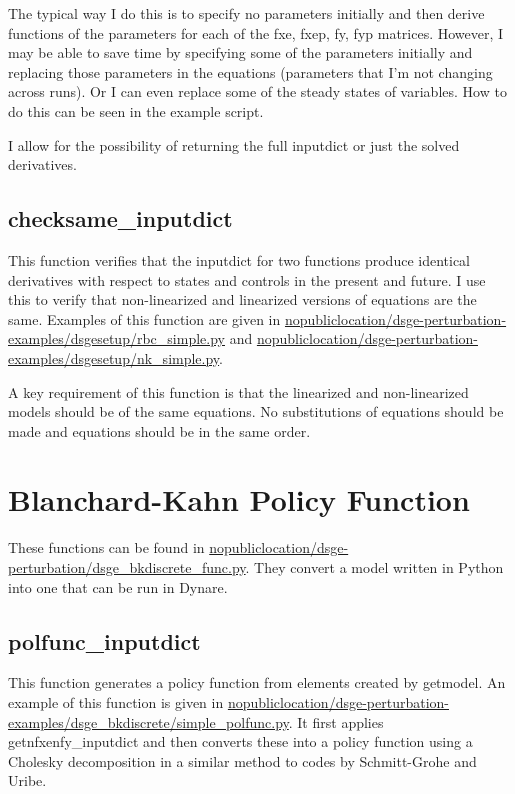 \documentclass{article}
\theoremstyle{definition}
\begin{document}
The typical way I do this is to specify no parameters initially and then derive functions of the parameters for each of the fxe, fxep, fy, fyp matrices. However, I may be able to save time by specifying some of the parameters initially and replacing those parameters in the equations (parameters that I'm not changing across runs). Or I can even replace some of the steady states of variables. How to do this can be seen in the example script.

I allow for the possibility of returning the full inputdict or just the solved derivatives.

\subsection{checksame\_inputdict}
This function verifies that the inputdict for two functions produce identical derivatives with respect to states and controls in the present and future. I use this to verify that non-linearized and linearized versions of equations are the same. Examples of this function are given in \url{nopubliclocation/dsge-perturbation-examples/dsgesetup/rbc_simple.py} and \url{nopubliclocation/dsge-perturbation-examples/dsgesetup/nk_simple.py}. 

A key requirement of this function is that the linearized and non-linearized models should be of the same equations. No substitutions of equations should be made and equations should be in the same order.





\section{Blanchard-Kahn Policy Function}
These functions can be found in \url{nopubliclocation/dsge-perturbation/dsge_bkdiscrete_func.py}. They convert a model written in Python into one that can be run in Dynare.

\subsection{polfunc\_inputdict}
This function generates a policy function from elements created by getmodel. An example of this function is given in \url{nopubliclocation/dsge-perturbation-examples/dsge_bkdiscrete/simple_polfunc.py}. It first applies getnfxenfy\_inputdict and then converts these into a policy function using a Cholesky decomposition in a similar method to codes by Schmitt-Grohe and Uribe.
\end{document}
